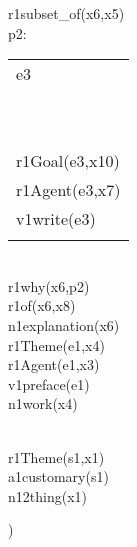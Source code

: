 \documentclass[10pt]{article}
\newcommand{\drs}[2]
{
   \begin{tabular}{|l|}
   \hline
   #1
   \\
   ~ \vspace{-2ex} \\
   \hline
   ~ \vspace{-2ex} \\
   #2
   \\
   \hline
   \end{tabular}
}
\begin{document}
{{r1subset\_of(x6,x5)\\[1pt]
p2:\drs{e3}{r1Goal(e3,x10)\\[1pt]
r1Agent(e3,x7)\\[1pt]
v1write(e3)\\[-3pt]}\\[9pt]
r1why(x6,p2)\\[1pt]
r1of(x6,x8)\\[1pt]
n1explanation(x6)\\[1pt]
r1Theme(e1,x4)\\[1pt]
r1Agent(e1,x3)\\[1pt]
v1preface(e1)\\[1pt]
n1work(x4)\\[-3pt]}\\[9pt]
r1Theme(s1,x1)\\[1pt]
a1customary(s1)\\[1pt]
n12thing(x1)\\[-3pt]})

\end{document}
